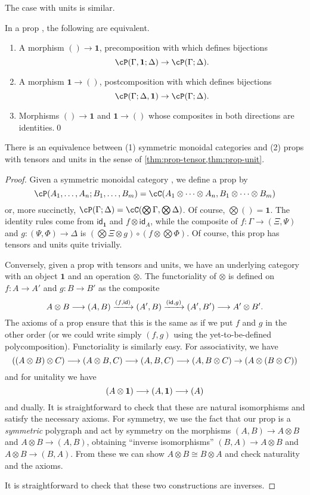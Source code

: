 \documentclass{book}
\def\idfunc{\mathsf{id}}
\def\unit{\mathbf{1}}
\def\one{\mathbf{1}}
\let\tensor\otimes
\let\bigtensor\bigotimes
\begin{document}
The case with units is similar.

\begin{lem}\label{thm:prop-unit}
  In a prop \cP, the following are equivalent.
  \begin{enumerate}
  \item A morphism $()\to \one$, precomposition with which defines bijections
    \[\cP(\Gamma,\one;\Delta) \to \cP(\Gamma;\Delta).\]
  \item A morphism $\one\to()$, postcomposition with which defines bijections
    \[\cP(\Gamma;\Delta,\one) \to \cP(\Gamma;\Delta).\]
  \item Morphisms $()\to \one$ and $\one\to()$ whose composites in both directions are identities.\qed
  \end{enumerate}
\end{lem}

\begin{thm}\label{thm:prop-smc}
  There is an equivalence between (1) symmetric monoidal categories and (2) props with tensors and units in the sense of \cref{thm:prop-tensor,thm:prop-unit}.
\end{thm}
\begin{proof}
  Given a symmetric monoidal category \cC, we define a prop \cP by
  \[ \cP(A_1,\dots,A_n ; B_1,\dots,B_m) = \cC(A_1\tensor \cdots\tensor A_n, B_1\tensor\cdots\tensor B_m)\]
  or, more succinctly, $\cP(\Gamma;\Delta) = \cC(\bigtensor\Gamma, \bigtensor\Delta)$.
  Of course, $\bigtensor() = \one$.
  The identity rules come from $\idfunc_\one$ and $f\tensor \idfunc_A$, while the composite of $f:\Gamma\to (\Xi,\Psi)$ and $g:(\Psi,\Phi)\to \Delta$ is $(\bigtensor\Xi \tensor g) \circ (f\tensor \bigtensor \Phi)$.
  Of course, this prop has tensors and units quite trivially.

  Conversely, given a prop with tensors and units, we have an underlying category with an object $\one$ and an operation $\tensor$.
  The functoriality of $\tensor$ is defined on $f:A\to A'$ and $g:B\to B'$ as the composite
  \[ A\tensor B \too (A,B) \xto{(f,\idfunc)} (A',B) \xto{(\idfunc,g)} (A',B') \too A'\tensor B'. \]
  The axioms of a prop ensure that this is the same as if we put $f$ and $g$ in the other order (or we could write simply $(f,g)$ using the yet-to-be-defined polycomposition).
  Functoriality is similarly easy.
  For associativity, we have
  \[ ((A\tensor B)\tensor C) \too (A\tensor B,C) \too (A,B,C) \too (A,B\tensor C) \to (A\tensor (B\tensor C)) \]
  and for unitality we have
  \[ (A\tensor \unit) \too (A,\unit) \too (A) \]
  and dually.
  It is straightforward to check that these are natural isomorphisms and satisfy the necessary axioms.
  For symmetry, we use the fact that our prop is a \emph{symmetric} polygraph and act by symmetry on the morphisms $(A,B)\to A\tensor B$ and $A\tensor B\to (A,B)$, obtaining ``inverse isomorphisms'' $(B,A) \to A\tensor B$ and $A\tensor B \to (B,A)$.
  From these we can show $A\tensor B \cong B\tensor A$ and check naturality and the axioms.

  It is straightforward to check that these two constructions are inverses.
\end{proof}
\end{document}
